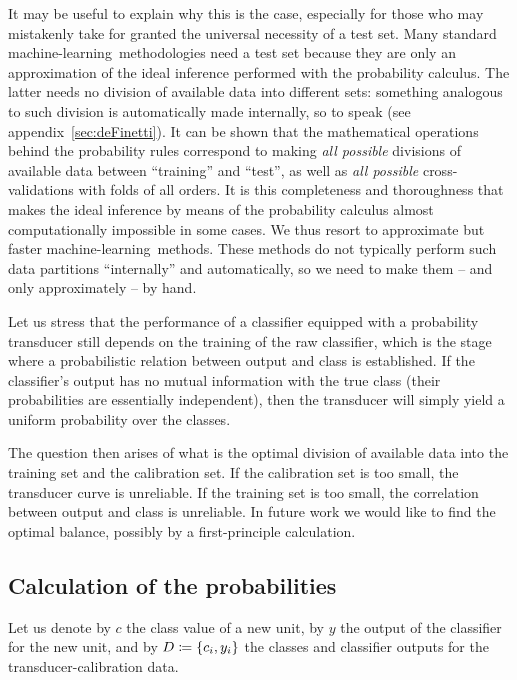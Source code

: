 \documentclass[\ifafour a4paper,12pt,\else a5paper,10pt,\fi%
onecolumn,oneside,article,%
british%
]{memoir}
\theoremstyle{remark}
\theoremstyle{innote}
\newcommand*{\defd}{\coloneqq}
\DeclarePairedDelimiter\set{\{}{\}} %
\renewcommand*{\|}[1][]{\nonscript\:#1\vert\nonscript\:\mathopen{}}
\newcommand*{\ml}{machine-learning}
\begin{document}
It may be useful to explain why this is the case, especially for those who may mistakenly take for granted the universal necessity of a test set. Many standard \ml\ methodologies need a test set because they are only an approximation of the ideal inference performed with the probability calculus. The latter needs no division of available data into different sets: something analogous to such division is automatically made internally, so to speak (see appendix~\ref{sec:deFinetti}). It can be shown \autocites{portamana2019b,fongetal2020,wald1949}[many examples of this fact are scattered across the text by][]{jaynes1994_r2003} that the mathematical operations behind the probability rules correspond to making \emph{all possible} divisions of available data between \enquote{training} and \enquote{test}, as well as \emph{all possible} cross-validations with folds of all orders. It is this completeness and thoroughness that makes the ideal inference by means of the probability calculus almost computationally impossible in some cases. We thus resort to approximate but faster \ml\ methods. These methods do not typically perform such data partitions \enquote{internally} and automatically, so we need to make them -- and only approximately -- by hand.

\medskip

Let us stress that the performance of a classifier equipped with a probability transducer still depends on the training of the raw classifier, which is the stage where a probabilistic relation between output and class is established. If the classifier's output has no mutual information with the true class (their probabilities are essentially independent), then the transducer will simply yield a uniform probability over the classes.

The question then arises of what is the optimal division of available data into the training set and the calibration set. If the calibration set is too small, the transducer curve is unreliable. If the training set is too small, the correlation between output and class is unreliable. In future work we would like to find the optimal balance, possibly by a first-principle calculation.



\subsection{Calculation of the probabilities}
\label{sec:calculation_transducer}

Let us denote by $c$ the class value of a new unit, by $y$ the output of the classifier for the new unit, and by $D \defd \set{c_{i}, y_{i}}$ the classes and classifier outputs for the transducer-calibration data.
\end{document}
